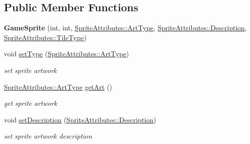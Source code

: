 \subsection*{Public Member Functions}
\begin{DoxyCompactItemize}
\item 
\mbox{\label{class_game_sprite_aa5e7e9276033b85ebe41123bf9e203f4}} 
{\bfseries Game\+Sprite} (int, int, \mbox{\hyperlink{namespace_sprite_attributes_afb5447c311bc29f0ce8ddfd025c6e998}{Sprite\+Attributes\+::\+Art\+Type}}, \mbox{\hyperlink{namespace_sprite_attributes_a3ece96d6288b14d53d84e2138392395c}{Sprite\+Attributes\+::\+Description}}, \mbox{\hyperlink{namespace_sprite_attributes_a254503d1929a87fa82146c9b7d19c2df}{Sprite\+Attributes\+::\+Tile\+Type}})
\item 
\mbox{\label{class_game_sprite_a58f1b3fce8064be9921bd37869e9b117}} 
void \mbox{\hyperlink{class_game_sprite_a58f1b3fce8064be9921bd37869e9b117}{set\+Type}} (\mbox{\hyperlink{namespace_sprite_attributes_afb5447c311bc29f0ce8ddfd025c6e998}{Sprite\+Attributes\+::\+Art\+Type}})
\begin{DoxyCompactList}\small\item\em set sprite artwork \end{DoxyCompactList}\item 
\mbox{\label{class_game_sprite_a7125087aa8a0c333a7aa6835ecf8c6c8}} 
\mbox{\hyperlink{namespace_sprite_attributes_afb5447c311bc29f0ce8ddfd025c6e998}{Sprite\+Attributes\+::\+Art\+Type}} \mbox{\hyperlink{class_game_sprite_a7125087aa8a0c333a7aa6835ecf8c6c8}{get\+Art}} ()
\begin{DoxyCompactList}\small\item\em get sprite artwork \end{DoxyCompactList}\item 
\mbox{\label{class_game_sprite_a28d3d766c1f6cacc84445fdfe5b6e25e}} 
void \mbox{\hyperlink{class_game_sprite_a28d3d766c1f6cacc84445fdfe5b6e25e}{set\+Description}} (\mbox{\hyperlink{namespace_sprite_attributes_a3ece96d6288b14d53d84e2138392395c}{Sprite\+Attributes\+::\+Description}})
\begin{DoxyCompactList}\small\item\em set sprite artwork description \end{DoxyCompactList}\item 

\end{DoxyCompactItemize}
